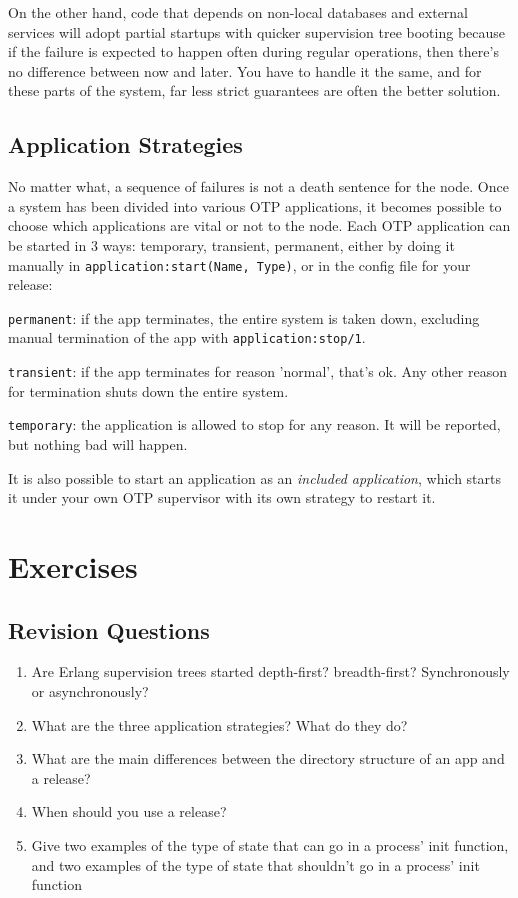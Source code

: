 \documentclass[11pt, oneside]{book}   	%
\newcommand{\function}[1]{\Verb`#1`}
\newcommand{\expression}[1]{\Verb`#1`}
\newcommand{\term}[1]{\Verb`#1`}
\begin{document}
On the other hand, code that depends on non-local databases and external services will adopt partial startups with quicker supervision tree booting because if the failure is expected to happen often during regular operations,
then there's no difference between now and later. You have to handle it the same, and for these parts of the system, far less strict guarantees are often the better solution.

\subsection{Application Strategies}
\label{subsec:start-link-application-strategies}

No matter what, a sequence of failures is not a death sentence for the node. Once a system has been divided into various OTP applications, it becomes possible to choose which applications are vital or not to the node. Each OTP application can be started in 3 ways: temporary, transient, permanent, either by doing it manually in \expression{application:start(Name, Type)}, or in the config file for your release:

\begin{itemize*}
	\item \term{permanent}: if the app terminates, the entire system is taken down, excluding manual termination of the app with \function{application:stop/1}.
	\item \term{transient}: if the app terminates for reason 'normal', that's ok. Any other reason for termination shuts down the entire system.
	\item \term{temporary}: the application is allowed to stop for any reason. It will be reported, but nothing bad will happen.
\end{itemize*}

It is also possible to start an application as an \emph{included application}, which starts it under your own OTP supervisor with its own strategy to restart it.

\section{Exercises}

\subsection{Revision Questions}

\begin{enumerate}
	\item  Are Erlang supervision trees started depth-first? breadth-first? Synchronously or asynchronously?
	\item What are the three application strategies? What do they do?
	\item What are the main differences between the directory structure of an app and a release?
	\item When should you use a release?
	\item Give two examples of the type of state that can go in a process' init function, and two examples of the type of state that shouldn't go in a process' init function
\end{enumerate}
\end{document}
